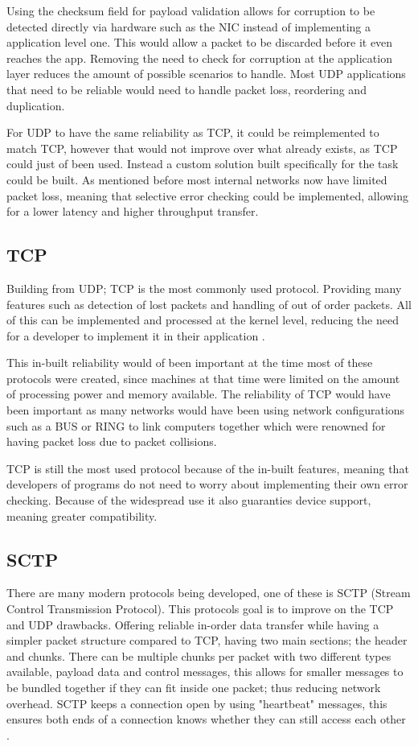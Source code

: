 Using the checksum field for payload validation allows for corruption to be detected directly via hardware such as the NIC instead of implementing a application level one. This would allow a packet to be discarded before it even reaches the app. Removing the need to check for corruption at the application layer reduces the amount of possible scenarios to handle. Most UDP applications that need to be reliable would need to handle packet loss, reordering and duplication.

For UDP to have the same reliability as TCP, it could be reimplemented to match TCP, however that would not improve over what already exists, as TCP could just of been used. Instead a custom solution built specifically for the task could be built. As mentioned before most internal networks now have limited packet loss, meaning that selective error checking could be implemented, allowing for a lower latency and higher throughput transfer.

\subsection*{TCP}
Building from UDP; TCP is the most commonly used protocol. Providing many features such as detection of lost packets and handling of out of order packets. All of this can be implemented and processed at the kernel level, reducing the need for a developer to implement it in their application \parencite{tcp-rfc793}.

This in-built reliability would of been important at the time most of these protocols were created, since machines at that time were limited on the amount of processing power and memory available. The reliability of TCP would have been important as many networks would have been using network configurations such as a BUS or RING to link computers together which were renowned for having packet loss due to packet collisions.

TCP is still the most used protocol because of the in-built features, meaning that developers of programs do not need to worry about implementing their own error checking. Because of the widespread use it also guaranties device support, meaning greater compatibility.

\subsection*{SCTP}
There are many modern protocols being developed, one of these is SCTP (Stream Control Transmission Protocol). This protocols goal is to improve on the TCP and UDP drawbacks. Offering reliable in-order data transfer while having a simpler packet structure compared to TCP, having two main sections; the header and chunks. There can be multiple chunks per packet with two different types available, payload data and control messages, this allows for smaller messages to be bundled together if they can fit inside one packet; thus reducing network overhead. SCTP keeps a connection open by using "heartbeat" messages, this ensures both ends of a connection knows whether they can still access each other \parencite{sctp-rfc9260} \parencite{ladha2004improving}.


